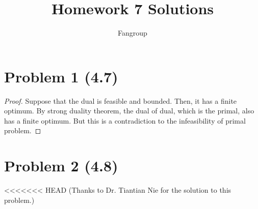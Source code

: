 \documentclass[12pt]{article}
\begin{document}
 
 
\title{Homework 7 Solutions}
\author{Fangroup}
\maketitle

\section*{Problem 1 (4.7)}

\begin{proof}

Suppose that the dual is feasible and bounded. Then, it has a finite optimum. By strong duality theorem, the dual of dual, which is the primal, also has a finite optimum. But this is a contradiction to the infeasibility of primal problem.

\end{proof}

\section*{Problem 2 (4.8)}

<<<<<<< HEAD
(Thanks to Dr. Tiantian Nie for the solution to this problem.)
\end{document}
